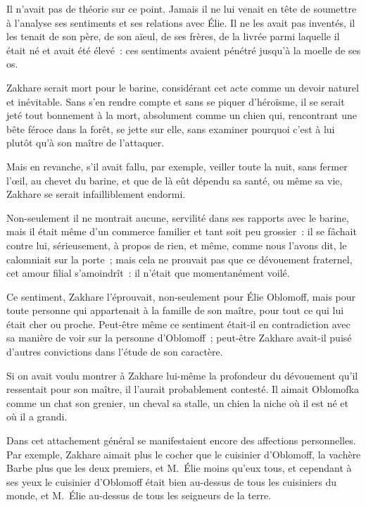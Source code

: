 \documentclass[french,twoside]{book} %
\begin{document}
Il n’avait pas de théorie sur ce point. Jamais il ne lui venait en tête de soumettre à l’analyse ses sentiments et ses relations avec Élie. Il ne les avait pas inventés, il les tenait de son père, de son aïeul, de ses frères, de la livrée parmi laquelle il était né et avait été élevé : ces sentiments avaient pénétré jusqu’à la moelle de ses os.\par
Zakhare serait mort pour le barine, considérant cet acte comme un devoir naturel et inévitable. Sans s’en rendre compte et sans se piquer d’héroïsme, il se serait jeté tout bonnement à la mort, absolument comme un chien qui, rencontrant une bête féroce dans la forêt, se jette sur elle, sans examiner pourquoi c’est à lui plutôt qu’à son maître de l’attaquer.\par
Mais en revanche, s’il avait fallu, par exemple, veiller toute la nuit, sans fermer l’œil, au chevet du barine, et que de là eût dépendu sa santé, ou même sa vie, Zakhare se serait infailliblement endormi.\par
Non-seulement il ne montrait aucune, servilité dans ses rapports avec le barine, mais il était même d’un commerce familier et tant soit peu grossier : il se fâchait contre lui, sérieusement, à propos de rien, et même, comme nous l’avons dit, le calomniait sur la porte ; mais cela ne prouvait pas que ce dévouement fraternel, cet amour filial s’amoindrît : il n’était que momentanément voilé.\par
Ce sentiment, Zakhare l’éprouvait, non-seulement pour Élie Oblomoff, mais pour toute personne qui appartenait à la famille de son maître, pour tout ce qui lui était cher ou proche. Peut-être même ce sentiment était-il en contradiction avec sa manière de voir sur la personne d’Oblomoff ; peut-être Zakhare avait-il puisé d’autres convictions dans l’étude de son caractère.\par
Si on avait voulu montrer à Zakhare lui-même la profondeur du dévouement qu’il ressentait pour son maître, il l’aurait probablement contesté. Il aimait Oblomofka comme un chat son grenier, un cheval sa stalle, un chien la niche où il est né et où il a grandi.\par
Dans cet attachement général se manifestaient encore des affections personnelles. Par exemple, Zakhare aimait plus le cocher que le cuisinier d’Oblomoff, la vachère Barbe plus que les deux premiers, et M. Élie moins qu’eux tous, et cependant à ses yeux le cuisinier d’Oblomoff était bien au-dessus de tous les cuisiniers du monde, et M. Élie au-dessus de tous les seigneurs de la terre.\par
\end{document}
